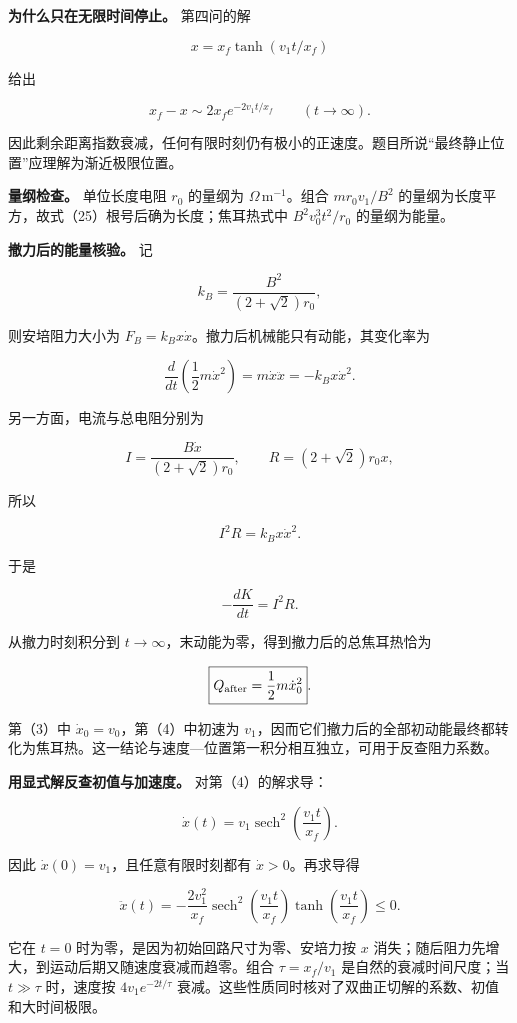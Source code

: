 \documentclass[12pt,a4paper,UTF8]{ctexart}
\begin{document}
\textbf{为什么只在无限时间停止。} 第四问的解

\[
x=x_f\tanh(v_1t/x_f)
\]

给出

\[
x_f-x\sim2x_f e^{-2v_1t/x_f}\qquad(t\to\infty).
\]

因此剩余距离指数衰减，任何有限时刻仍有极小的正速度。题目所说``最终静止位置''应理解为渐近极限位置。

\textbf{量纲检查。} 单位长度电阻 \(r_0\) 的量纲为
\(\Omega\,\mathrm m^{-1}\)。组合 \(mr_0v_1/B^2\)
的量纲为长度平方，故式（25）根号后确为长度；焦耳热式中
\(B^2v_0^3t^2/r_0\) 的量纲为能量。

\textbf{撤力后的能量核验。} 记

\[
k_B=\frac{B^2}{(2+\sqrt2)r_0},
\]

则安培阻力大小为 \(F_B=k_Bx\dot x\)。撤力后机械能只有动能，其变化率为

\[
\frac{d}{dt}\left(\frac12m\dot x^2\right)
=m\dot x\ddot x
=-k_Bx\dot x^2.
\]

另一方面，电流与总电阻分别为

\[
I=\frac{B\dot x}{(2+\sqrt2)r_0},
\qquad
R=(2+\sqrt2)r_0x,
\]

所以

\[
I^2R=k_Bx\dot x^2.
\]

于是

\[
-\frac{dK}{dt}=I^2R.
\]

从撤力时刻积分到 \(t\to\infty\)，末动能为零，得到撤力后的总焦耳热恰为

\[
\boxed{Q_{\rm after}=\frac12m\dot x_0^2}.
\]

第（3）中 \(\dot x_0=v_0\)，第（4）中初速为
\(v_1\)，因而它们撤力后的全部初动能最终都转化为焦耳热。这一结论与速度---位置第一积分相互独立，可用于反查阻力系数。

\textbf{用显式解反查初值与加速度。} 对第（4）的解求导：

\[
\dot x(t)
=v_1\operatorname{sech}^2
\left(\frac{v_1t}{x_f}\right).
\]

因此 \(\dot x(0)=v_1\)，且任意有限时刻都有 \(\dot x>0\)。再求导得

\[
\ddot x(t)
=-\frac{2v_1^2}{x_f}
\operatorname{sech}^2
\left(\frac{v_1t}{x_f}\right)
\tanh\left(\frac{v_1t}{x_f}\right)\le0.
\]

它在 \(t=0\) 时为零，是因为初始回路尺寸为零、安培力按 \(x\)
消失；随后阻力先增大，到运动后期又随速度衰减而趋零。组合
\(\tau=x_f/v_1\) 是自然的衰减时间尺度；当 \(t\gg\tau\) 时，速度按
\(4v_1e^{-2t/\tau}\)
衰减。这些性质同时核对了双曲正切解的系数、初值和大时间极限。
\end{document}
